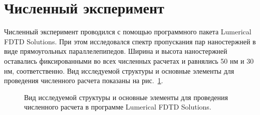 \section{Численный эксперимент}

Численный эксперимент проводился с помощью программного пакета Lumerical FDTD Solutions. При этом исследовался спектр пропускания пар наностержней в виде прямоугольных параллелепипедов. Ширина и высота наностержней оставались фиксированными во всех численных расчетах и равнялись 50 нм и 30 нм, соответственно. Вид исследуемой структуры и основные элементы для проведения численного расчета показаны на рис.~\ref{img:lumerical}. 
\begin{figure}
\caption{Вид исследуемой структуры и основные элементы для проведения численного расчета в программе Lumerical FDTD Solutions.}
\label{img:lumerical}
\end{figure}

